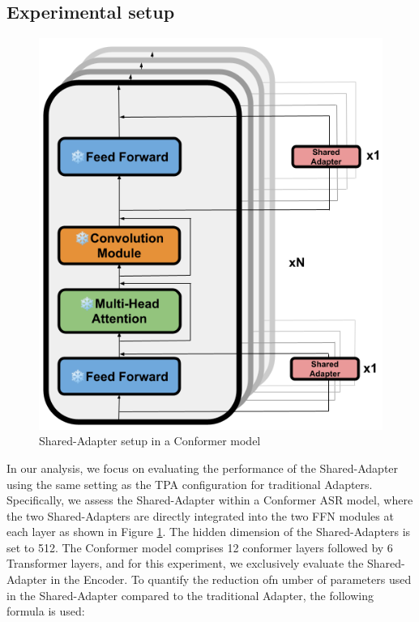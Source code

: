 \subsection{Experimental setup}
\begin{figure}
    \begin{center}
        \includegraphics[scale=0.3]{imgs/Shared_Adapters.png}
        \caption{Shared-Adapter setup in a Conformer model}
        \label{fig:Shared_adapter}
    \end{center}
\end{figure}
In our analysis, we focus on evaluating the performance of the Shared-Adapter using the same setting as the TPA configuration for traditional Adapters. Specifically, we assess the Shared-Adapter within a Conformer ASR model, where the two Shared-Adapters are directly integrated into the two FFN modules at each layer as shown in Figure \ref{fig:Shared_adapter}.  The hidden dimension of the Shared-Adapters is set to 512. The Conformer model comprises 12 conformer layers followed by 6 Transformer layers, and for this experiment, we exclusively evaluate the Shared-Adapter in the Encoder.
To quantify the reduction ofn umber of parameters used in the Shared-Adapter compared to the traditional Adapter, the following formula is used:
